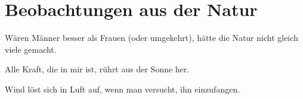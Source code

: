 \chapter{Beobachtungen aus der Natur}

Wären Männer besser als Frauen (oder umgekehrt),
hätte die Natur nicht gleich viele gemacht.

\vspace{1em}

Alle Kraft, die in mir ist, rührt aus der Sonne her.

\vspace{1em}

Wind löst sich in Luft auf, wenn man versucht, ihn einzufangen.

